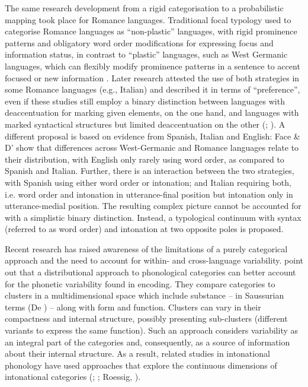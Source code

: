 The same research development from a rigid categorisation to a probabilistic mapping took place for Romance languages. Traditional focal typology used to categorise Romance languages as “non-plastic” languages, with rigid prominence patterns and obligatory word order modifications for expressing focus and information status, in contrast to “plastic” languages, such as West Germanic languages, which can flexibly modify prominence patterns in a sentence to accent focused or new information \citep{Vallduví1991}. Later research attested the use of both strategies in some Romance languages (e.g., Italian) and described it in terms of “preference”, even if these studies still employ a binary distinction between languages with deaccentuation for marking given elements, on the one hand, and languages with marked syntactical structures but limited deaccentuation on the other (\citealt{Cruttenden1993}; \citealt{Ladd1996,Ladd2008}). A different proposal is based on evidence from Spanish, Italian and English: Face \& D’\citet{Imperio2005} show that differences across West-Germanic and Romance languages relate to their distribution, with English only rarely using word order, as compared to Spanish and Italian. Further, there is an interaction between the two strategies, with Spanish using either word order or intonation; and Italian requiring both, i.e. word order and intonation in utterance-final position but intonation only in utterance-medial position. The resulting complex picture cannot be accounted for with a simplistic binary distinction. Instead, a typological continuum with syntax (referred to as word order) and intonation at two opposite poles is proposed.

Recent research has raised awareness of the limitations of a purely categorical approach and the need to account for within- and cross-language variability. \citet{CangemiGrice2016} point out that a distributional approach to phonological categories can better account for the phonetic variability found in encoding. They compare categories to clusters in a multidimensional space which include substance – in Saussurian terms (De \citealt{Saussure1916}) – along with form and function. Clusters can vary in their compactness and internal structure, possibly presenting sub-clusters (different variants to express the same function). Such an approach considers variability as an integral part of the categories and, consequently, as a source of information about their internal structure. As a result, related studies in intonational phonology have used approaches that explore the continuous dimensions of intonational categories (\citealt{CangemiGrice2016}; \citealt{GriceEtAl2017}; Roessig, \citealt{MückeGrice2019}).

